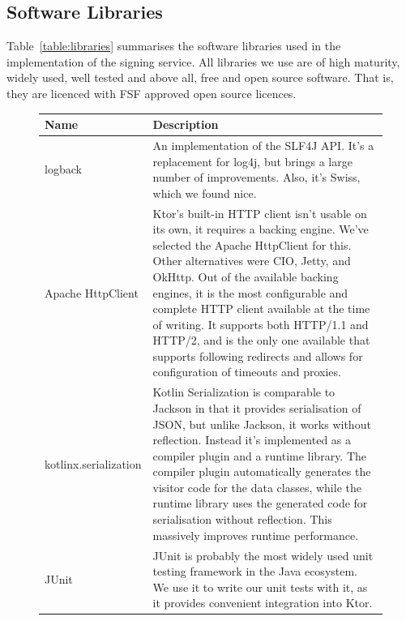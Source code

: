 \subsection{Software Libraries}\label{subsec:software-libraries}
Table~\ref{table:libraries} summarises the software libraries used in the implementation of the signing service.
All libraries we use are of high maturity, widely used, well tested and above all,
free and open source software.
That is, they are licenced with \gls{FSF} approved open source licences.

\begin{figure}
    \begin{center}
        \begin{tabular}{p{3cm}|p{12cm}}
            \textbf{Name} & \textbf{Description} \\ \hline
            logback &
            An implementation of the \gls{SLF4J} \gls{API}.
            It's a replacement for log4j, but brings a large number of improvements.
            Also, it's Swiss, which we found nice.
            \\ \hline
            Apache HttpClient &
            Ktor's built-in \gls{HTTP} client isn't usable on its own,
            it requires a backing engine.
            We've selected the Apache HttpClient for this.
            Other alternatives were \gls{CIO}, Jetty, and OkHttp.
            Out of the available backing engines, it is the most configurable and complete \gls{HTTP} client available at the time of writing.
            It supports both \gls{HTTP}/1.1 and \gls{HTTP}/2,
            and is the only one available that supports following redirects and allows for configuration of timeouts and proxies.
            \\ \hline
            kotlinx.serialization &
            Kotlin Serialization is comparable to Jackson in that it provides serialisation of \gls{JSON},
            but unlike Jackson,
            it works without reflection.
            Instead it's implemented as a compiler plugin and a runtime library.
            The compiler plugin automatically generates the visitor code for the data classes,
            while the runtime library uses the generated code for serialisation without reflection.
            This massively improves runtime performance.
            \\ \hline
            JUnit &
            JUnit is probably the most widely used unit testing framework in the Java ecosystem.
            We use it to write our unit tests with it,
            as it provides convenient integration into Ktor.

\end{tabular}
\end{center}
\end{figure}
